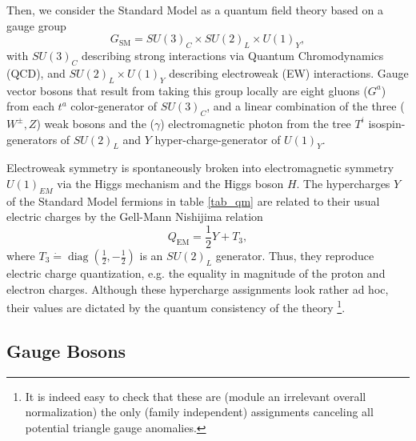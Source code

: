 Then, we consider the Standard Model as a quantum field theory based on a gauge group
\begin{equation}
	G_{\mathrm{SM}}=S U(3)_C \times S U(2)_{L} \times U(1)_{Y},
\end{equation}
with $S U(3)_C$ describing strong interactions via Quantum Chromodynamics (QCD), and $S U(2)_{L} \times U(1)_{Y}$ describing electroweak (EW) interactions. Gauge vector bosons that result from taking this group locally are eight gluons ($G^a$) from each $t^a$ color-generator of $SU(3)_C$, and a linear combination of the three ($W^\pm, Z$) weak bosons and the ($\gamma$) electromagnetic photon from the tree $T^i$ isospin-generators of $SU(2)_L$ and $Y$ hyper-charge-generator of $U(1)_Y$.

Electroweak symmetry is spontaneously broken into electromagnetic symmetry $U(1)_{EM}$ via the Higgs mechanism and the Higgs boson $H$. The hypercharges $Y$ of the Standard Model fermions in table \ref{tab_qm} are related to their usual electric charges by the Gell-Mann Nishijima relation~\parencite{10.1143/PTP.10.581} 
\begin{equation}
	Q_{\mathrm{EM}}=\frac12Y+T_{3}, \label{eq:Gell-Mann-Nishijima}
\end{equation}
where $T_{3}\dot=\operatorname{diag}\left(\frac{1}{2},-\frac{1}{2}\right)$ is an $S U(2)_{L}$ generator.  Thus, they reproduce electric charge quantization, e.g. the equality in magnitude of the proton and electron charges. Although these hypercharge assignments look rather ad hoc, their values are dictated by the quantum consistency of the theory \footnote{It is indeed easy to check that these are (module an irrelevant overall normalization) the only (family independent) assignments canceling all potential triangle gauge anomalies.}. 

\subsection{Gauge Bosons}

